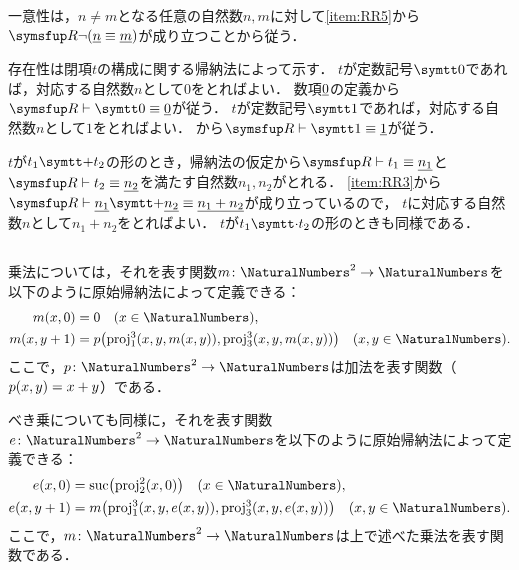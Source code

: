 一意性は，\(n \neq m\)となる任意の自然数\(n, m\)に対して\cref{item:RR5}から\(\RArithmetic \lnot \paren{\numeral{n} \objeq \numeral{m}}\)が成り立つことから従う．

存在性は閉項\(t\)の構成に関する帰納法によって示す．
\(t\)が定数記号\(\obj{0}\)であれば，対応する自然数\(n\)として\(0\)をとればよい．
数項\(\underline{0}\)の定義から\(\RArithmetic \provable \obj{0} \objeq \numeral{0}\)が従う．
\(t\)が定数記号\(\obj{1}\)であれば，対応する自然数\(n\)として\(1\)をとればよい．
から\(\RArithmetic \provable \obj{1} \objeq \numeral{1}\)が従う．

\(t\)が\(t_1 \obj{+} t_2\)の形のとき，帰納法の仮定から\(\RArithmetic \provable t_1 \objeq \numeral{n_1}\)と
\(\RArithmetic \provable t_2 \objeq \numeral{n_2}\)を満たす自然数\(n_1, n_2\)がとれる．
\cref{item:RR3}から\(\RArithmetic \provable \numeral{n_1} \obj{+} \numeral{n_2} \objeq \numeral{n_1 + n_2}\)が成り立っているので，
\(t\)に対応する自然数\(n\)として\(n_1 + n_2\)をとればよい．
\(t\)が\(t_1 \obj{\cdot} t_2\)の形のときも同様である．

\subsection*{}

乗法については，それを表す関数\(m \colon \NaturalNumbers^2 \to \NaturalNumbers\)を以下のように原始帰納法によって定義できる：
\begin{align*}
	\apply{m}{x, 0}     & = 0 \quad \text{(\(x \in \NaturalNumbers\))},                                                   \\
	\apply{m}{x, y + 1} & = \apply{p}{\apply{\proj_1^3}{x, y, \apply{m}{x, y}}, \apply{\proj_3^3}{x, y, \apply{m}{x, y}}}
	\quad \text{(\(x, y \in \NaturalNumbers\))}.
\end{align*}
ここで，\(p \colon \NaturalNumbers^2 \to \NaturalNumbers\)は加法を表す関数（\(\apply{p}{x, y} = x + y\)）である．

べき乗についても同様に，それを表す関数\(e \colon \NaturalNumbers^2 \to \NaturalNumbers\)を以下のように原始帰納法によって定義できる：
\begin{align*}
	\apply{e}{x, 0}     & = \apply{\suc}{\apply{\proj_2^2}{x, 0}} \quad \text{(\(x \in \NaturalNumbers\))},               \\
	\apply{e}{x, y + 1} & = \apply{m}{\apply{\proj_1^3}{x, y, \apply{e}{x, y}}, \apply{\proj_3^3}{x, y, \apply{e}{x, y}}}
	\quad \text{(\(x, y \in \NaturalNumbers\))}.
\end{align*}
ここで，\(m \colon \NaturalNumbers^2 \to \NaturalNumbers\)は上で述べた乗法を表す関数である．

